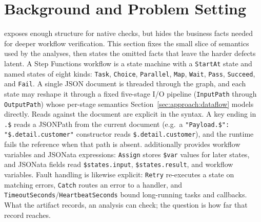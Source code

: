
\section{Background and Problem Setting}
\label{sec:bg}

\asl{} exposes enough structure for native checks, but hides the business facts needed for deeper
workflow verification. This section fixes the small slice of \asl{} semantics used by the
analyses, then states the omitted facts that leave the harder defects latent.
A Step Functions workflow is a state machine with a \texttt{StartAt}
state and named states of eight kinds: \texttt{Task}, \texttt{Choice},
\texttt{Parallel}, \texttt{Map}, \texttt{Wait}, \texttt{Pass},
\texttt{Succeed}, and \texttt{Fail}. A single JSON document is threaded
through the graph, and each state may reshape it through a fixed
five-stage I/O pipeline (\texttt{InputPath} through \texttt{OutputPath})
whose per-stage semantics Section~\ref{sec:approach:dataflow} models
directly.
Reads against the document are explicit in the syntax. A key ending in \texttt{.\$} reads a
JSONPath from the current document (e.g.\ a \texttt{"Payload.\$": "\$.detail.customer"}
constructor reads \texttt{\$.detail.customer}), and the runtime fails the reference when that path
is absent. \asl{} additionally provides workflow variables and JSONata expressions:
\texttt{Assign} stores \texttt{\$var} values for later states, and JSONata fields read
\texttt{\$states.input}, \texttt{\$states.result}, and workflow variables.
Fault handling is likewise explicit: \texttt{Retry} re-executes a state on matching errors,
\texttt{Catch} routes an error to a handler, and \texttt{TimeoutSeconds}/\texttt{HeartbeatSeconds}
bound long-running tasks and callbacks. What the artifact records, an analysis can check; the
question is how far that record reaches.

